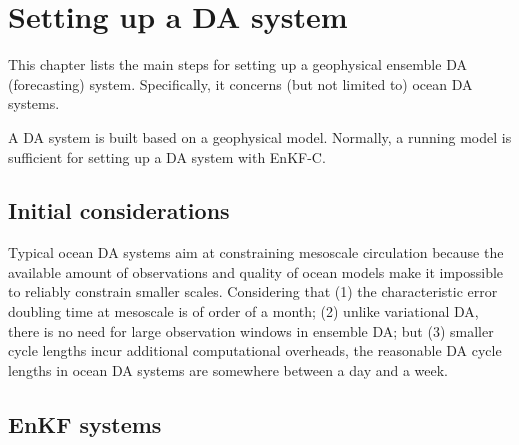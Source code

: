 \documentclass[11pt]{report}
\begin{document}
\chapter{Setting up a DA system}

This chapter lists the main steps for setting up a geophysical ensemble DA (forecasting) system.
Specifically, it concerns (but not limited to) ocean DA systems.

A DA system is built based on a geophysical model.
Normally, a running model is sufficient for setting up a DA system with EnKF-C.

\section{Initial considerations}

Typical ocean DA systems aim at constraining mesoscale circulation because the available amount of observations and quality of ocean models make it impossible to reliably constrain smaller scales.
Considering that (1) the characteristic error doubling time at mesoscale is of order of a month; (2) unlike variational DA, there is no need for large observation windows in ensemble DA; but (3) smaller cycle lengths incur additional computational overheads, the reasonable DA cycle lengths in ocean DA systems are somewhere between a day and a week.

\section{EnKF systems}
\label{sec:enkf_systems}
\end{document}
